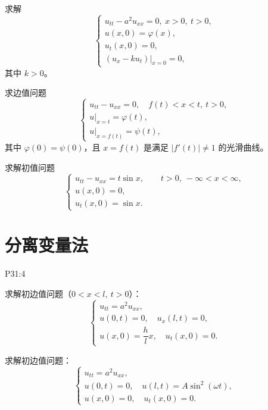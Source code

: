\begin{homework}
[5] 求解
\[
\begin{cases}
u_{tt}-a^{2}u_{xx}=0,\ x>0,\ t>0,\\[4pt]
u(x,0)=\varphi(x),\\[4pt]
u_t(x,0)=0,\\[4pt]
(u_x-ku_t)|_{x=0}=0,
\end{cases}
\]
其中 $k>0$。
\end{homework}

\begin{homework}
[7] 求边值问题
\[
\begin{cases}
u_{tt}-u_{xx}=0,\quad f(t)<x<t,\ t>0,\\[4pt]
u|_{x=t}=\varphi(t),\\[4pt]
u|_{x=f(t)}=\psi(t),
\end{cases}
\]
其中 $\varphi(0)=\psi(0)$，且 $x=f(t)$ 是满足 $|f'(t)|\neq1$ 的光滑曲线。
\end{homework}

\begin{homework}
[8] 求解初值问题
\[
\begin{cases}
u_{tt}-u_{xx}=t\sin x,\qquad t>0,\ -\infty<x<\infty,\\[4pt]
u(x,0)=0,\\[4pt]
u_t(x,0)=\sin x.
\end{cases}
\]
\end{homework}

\section{分离变量法}
P31:4
\begin{homework}[1(2)]
求解初边值问题（$0<x<l,\ t>0$）：
\[
\begin{cases}
u_{tt}=a^{2}u_{xx},\\[3pt]
u(0,t)=0,\quad u_x(l,t)=0,\\[3pt]
u(x,0)=\dfrac{h}{l}x,\quad u_t(x,0)=0.
\end{cases}
\]
\end{homework}

\begin{homework}[2]
求解初边值问题：
\[
\begin{cases}
u_{tt}=a^{2}u_{xx},\\[3pt]
u(0,t)=0,\quad u(l,t)=A\sin^{2}(\omega t),\\[3pt]
u(x,0)=0,\quad u_t(x,0)=0.
\end{cases}
\]
\end{homework}

